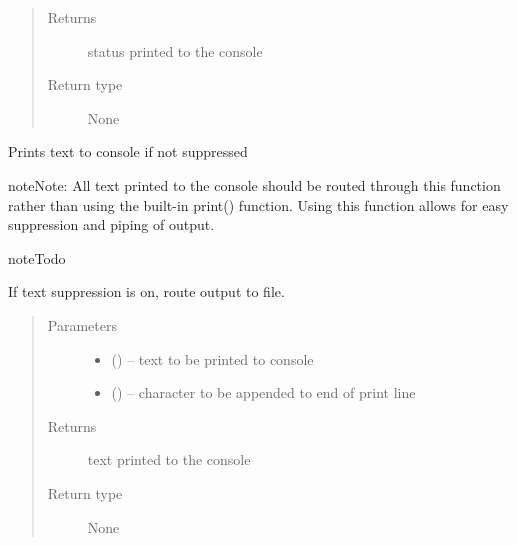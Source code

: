 \documentclass[letterpaper,10pt,english]{sphinxmanual}
\begin{document}
\begin{fulllineitems}
\begin{fulllineitems}
\begin{quote}
\begin{description}
\item[{Returns}] \leavevmode
status printed to the console

\item[{Return type}] \leavevmode
None

\end{description}\end{quote}

\end{fulllineitems}


\begin{fulllineitems}
\label{\detokenize{MouseReferenceManual:Modules.Base.ModuleBaseClass.printText}}
Prints text to console if not suppressed

\begin{sphinxadmonition}{note}{Note:}
All text printed to the console should be routed through this function rather than using the built-in print() function. Using this function allows for easy suppression and piping of output.
\end{sphinxadmonition}

\begin{sphinxadmonition}{note}{Todo}

If text suppression is on, route output to file.
\end{sphinxadmonition}
\begin{quote}\begin{description}
\item[{Parameters}] \leavevmode\begin{itemize}
\item {} 
 () -- text to be printed to console

\item {} 
 (\sphinxstyleliteralemphasis{, }) -- character to be appended to end of print line

\end{itemize}

\item[{Returns}] \leavevmode
text printed to the console

\item[{Return type}] \leavevmode
None


\end{description}
\end{quote}
\end{fulllineitems}
\end{fulllineitems}
\end{document}
